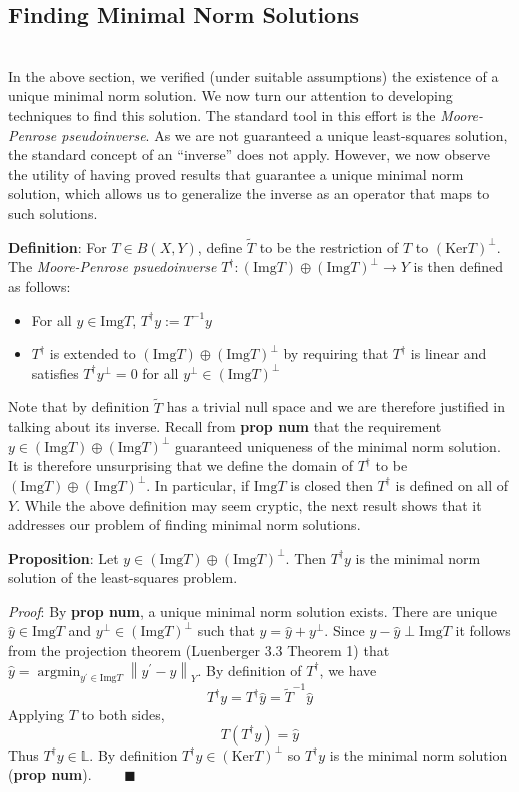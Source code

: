 \documentclass[12pt]{article}
\newcommand*{\norm}[1]{\left\lVert#1\right\rVert}
\newcommand{\Img}{\mathrm{Img}}
\newcommand{\Ker}{\mathrm{Ker}}
\DeclareMathOperator*{\argmin}{argmin}
\begin{document}
 \subsection{Finding Minimal Norm Solutions} \hfill \\
 
 In the above section, we verified (under suitable assumptions) the existence of a unique minimal norm solution. We now turn our attention to developing techniques to find this solution. The standard tool in this effort is the \textit{Moore-Penrose pseudoinverse}. As we are not guaranteed a unique least-squares solution, the standard concept of an ``inverse'' does not apply. However, we now observe the utility of having proved results that guarantee a unique minimal norm solution, which allows us to generalize the inverse as an operator that maps to such solutions. 
 
 \textbf{Definition}: For $T \in B(X, Y)$, define $\tilde{T}$ to be the restriction of $T$ to $(\Ker T)^\perp$. The \textit{Moore-Penrose psuedoinverse} $T^\dagger : (\Img T) \oplus (\Img T)^\perp \to Y$ is then defined as follows: 
 \begin{itemize} 
 \item For all $y \in \Img T$, $T^\dagger y := T^{-1}y$
 \item $T^\dagger$ is extended to $(\Img T) \oplus (\Img T)^\perp$ by requiring that $T^\dagger$ is linear and satisfies $T^\dagger y^\perp = 0$ for all $y^\perp \in (\Img T)^\perp$
 \end{itemize} 
 
Note that by definition $\tilde{T}$ has a trivial null space and we are therefore justified in talking about its inverse. Recall from \textbf{prop num} that the requirement $y \in (\Img T) \oplus (\Img T)^\perp$ guaranteed uniqueness of the minimal norm solution. It is therefore unsurprising that we define the domain of $T^\dagger$ to be $(\Img T) \oplus (\Img T)^\perp$. In particular, if $\Img T$ is closed then $T^\dagger$ is defined on all of $Y$. While the above definition may seem cryptic, the next result shows that it addresses our problem of finding minimal norm solutions.

\textbf{Proposition}: Let $y \in (\Img T) \oplus (\Img T)^\perp$. Then $T^\dagger y$ is the minimal norm solution of the least-squares problem. 

\smallskip 

\textit{Proof}: By \textbf{prop num}, a unique minimal norm solution exists. There are unique $\hat{y} \in \Img T$ and $y^\perp \in (\Img T)^\perp$ such that $y = \hat{y} + y^\perp$. Since $y - \hat{y} \perp \Img T$ it follows from the projection theorem (Luenberger 3.3 Theorem 1) that $\hat{y} = \argmin_{y^\prime \in \Img T} \norm{y^\prime - y}_Y$. By definition of $T^\dagger$, we have \[T^\dagger y = T^\dagger \hat{y} = \tilde{T}^{-1}\hat{y}\]
 Applying $T$ to both sides, \[T(T^\dagger y) = \hat{y}\]
 Thus $T^\dagger y \in \mathbb{L}$. By definition $T^\dagger y \in (\Ker T)^\perp$ so $T^\dagger y$ is the minimal norm solution (\textbf{prop num}). $\qquad \blacksquare$
 
 
 
 
 
 
 
\end{document}

